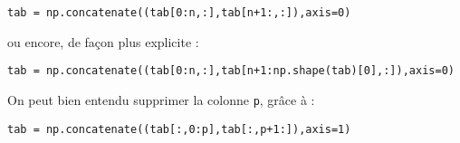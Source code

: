 \begin{verbatim}
tab = np.concatenate((tab[0:n,:],tab[n+1:,:]),axis=0)
\end{verbatim}

ou encore, de façon plus explicite :

\begin{verbatim}
tab = np.concatenate((tab[0:n,:],tab[n+1:np.shape(tab)[0],:]),axis=0)
\end{verbatim}

On peut bien entendu supprimer la colonne \verb|p|, grâce à :

\begin{verbatim}
tab = np.concatenate((tab[:,0:p],tab[:,p+1:]),axis=1)
\end{verbatim}


